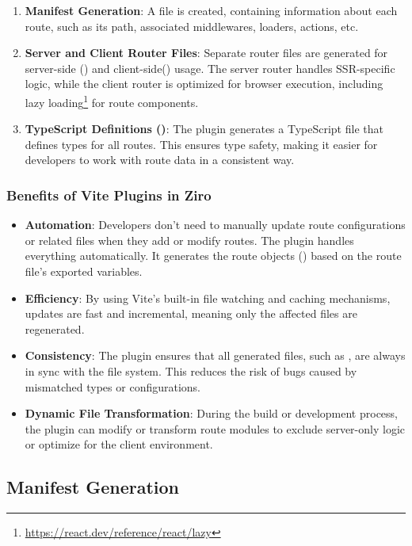 \begin{enumerate}
	\item \textbf{Manifest Generation}: A  file is created, containing information about each route, such as its path, associated middlewares, loaders, actions, etc.
	\item \textbf{Server and Client Router Files}: Separate router files are generated for server-side () and client-side() usage. The server router handles SSR-specific logic, while the client router is optimized for browser execution, including lazy loading\footnote{\url{https://react.dev/reference/react/lazy}} for route components.
	\item \textbf{TypeScript Definitions ()}: The plugin generates a TypeScript file that defines types for all routes. This ensures type safety, making it easier for developers to work with route data in a consistent way.
\end{enumerate}

\subsubsection{Benefits of Vite Plugins in Ziro}
\begin{itemize}
	\item \textbf{Automation}: Developers don’t need to manually update route configurations or related files when they add or modify routes. The plugin handles everything automatically. It generates the route objects () based on the route file's exported variables.
	\item \textbf{Efficiency}: By using Vite's built-in file watching and caching mechanisms, updates are fast and incremental, meaning only the affected files are regenerated.
	\item \textbf{Consistency}: The plugin ensures that all generated files, such as , are always in sync with the file system. This reduces the risk of bugs caused by mismatched types or configurations.
	\item \textbf{Dynamic File Transformation}: During the build or development process, the plugin can modify or transform route modules to exclude server-only logic or optimize for the client environment.
\end{itemize}

\subsection{Manifest Generation}

